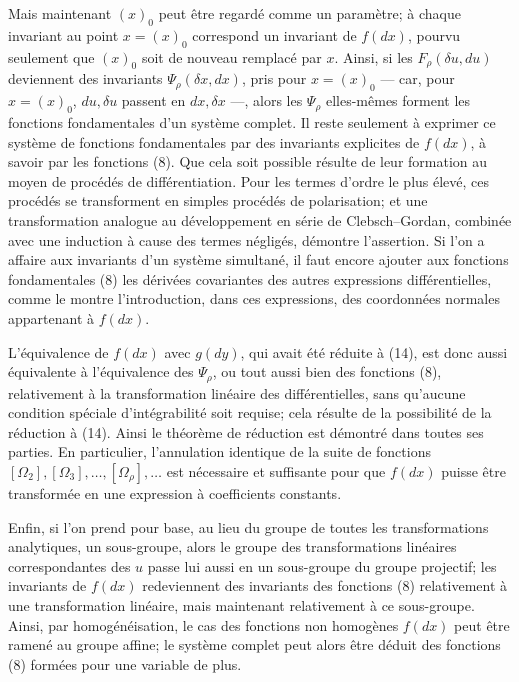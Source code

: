 Mais maintenant \((x)_0\) peut être regardé comme un paramètre; à chaque
invariant au point \(x=(x)_0\) correspond un invariant de \(f(dx)\), pourvu
seulement que \((x)_0\) soit de nouveau remplacé par \(x\). Ainsi, si les
\(F_\rho(\delta u,du)\) deviennent des invariants
\(\Psi_\rho(\delta x,dx)\), pris pour \(x=(x)_0\) --- car, pour \(x=(x)_0\),
\(du,\delta u\) passent en \(dx,\delta x\) ---, alors les \(\Psi_\rho\)
elles-mêmes forment les fonctions fondamentales d'un système complet.
Il reste seulement à exprimer ce système de fonctions fondamentales par
des invariants explicites de \(f(dx)\), à savoir par les fonctions (8).
Que cela soit possible résulte de leur formation au moyen de procédés de
différentiation. Pour les termes d'ordre le plus élevé, ces procédés se
transforment en simples procédés de polarisation; et une transformation
analogue au développement en série de Clebsch--Gordan, combinée avec une
induction à cause des termes négligés, démontre l'assertion. Si l'on a
affaire aux invariants d'un système simultané, il faut encore ajouter aux
fonctions fondamentales (8) les dérivées covariantes des autres expressions
différentielles, comme le montre l'introduction, dans ces expressions, des
coordonnées normales appartenant à \(f(dx)\).

L'équivalence de \(f(dx)\) avec \(g(dy)\), qui avait été réduite à (14),
est donc aussi équivalente à l'équivalence des \(\Psi_\rho\), ou tout aussi
bien des fonctions (8), relativement à la transformation linéaire des
différentielles, sans qu'aucune condition spéciale d'intégrabilité soit
requise; cela résulte de la possibilité de la réduction à (14). Ainsi le
théorème de réduction est démontré dans toutes ses parties. En particulier,
l'annulation identique de la suite de fonctions
\([\Omega_2],[\Omega_3],\ldots,[\Omega_\rho],\ldots\) est nécessaire et
suffisante pour que \(f(dx)\) puisse être transformée en une expression à
coefficients constants.

Enfin, si l'on prend pour base, au lieu du groupe de toutes les transformations
analytiques, un sous-groupe, alors le groupe des transformations linéaires
correspondantes des \(u\) passe lui aussi en un sous-groupe du groupe
projectif; les invariants de \(f(dx)\) redeviennent des invariants des
fonctions (8) relativement à une transformation linéaire, mais maintenant
relativement à ce sous-groupe. Ainsi, par homogénéisation, le cas des
fonctions non homogènes \(f(dx)\) peut être ramené au groupe affine; le
système complet peut alors être déduit des fonctions (8) formées pour
une variable de plus.

